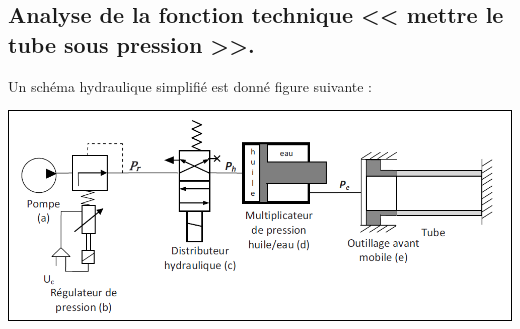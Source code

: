 \documentclass[10pt,fleqn]{article} %
\begin{document}
\begin{multicols}{2}
\subsection*{Analyse de la fonction technique << mettre le tube sous pression >>.}


Un schéma hydraulique simplifié est donné figure suivante :
\begin{center}
\includegraphics[width=\linewidth]{images_02/fig_01}
\end{center}

%


\end{multicols}
\end{document}

